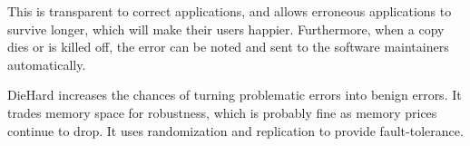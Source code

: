 \documentclass[twoside]{article}
\begin{document}
This is transparent to correct applications, and allows erroneous applications
to survive longer, which will make their users happier. Furthermore, when
a copy dies or is killed off, the error can be noted and sent to the software
maintainers automatically.

DieHard increases the chances of turning problematic errors into
benign errors. It trades memory space for robustness, which is probably
fine as memory prices continue to drop. It uses randomization and
replication to provide fault-tolerance.
\end{document}
